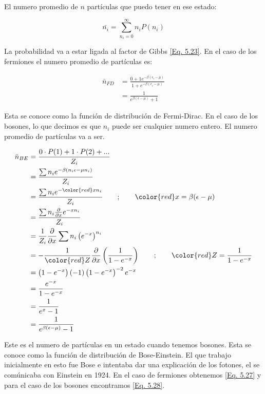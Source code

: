 \documentclass[11pt,fleqn]{book}
\begin{document}
El numero promedio de $n$ partículas que puedo tener en ese estado:

\begin{equation*}
    \bar{n_{i}}=\sum_{n_{i}=0}^{\infty}n_{i}P(n_{i})
\end{equation*}

La probabilidad va a estar ligada al factor de Gibbs \ref{Eq. 5.23}.  En el caso de los fermiones el numero promedio de partículas es: 

\begin{equation}
    \begin{split}
        \bar{n}_{FD}&=\frac{0+1e^{-\beta(\epsilon_{i}-\mu)}}{1+e^{-\beta(\epsilon_{i}-\mu)}}\\
        &=\frac{1}{e^{\beta(\epsilon-\mu)}+1}
    \end{split} 
    \label{Eq. 5.27}
    \end{equation}

Esta se conoce como la función de distribución de Fermi-Dirac. En el caso de los bosones, lo que decimos es que $n_{i}$ puede ser cualquier numero entero. El numero promedio de partículas va a ser. 

\begin{equation}
    \begin{split}
        \bar{n}_{BE}&=\frac{0\cdot P(1)+1\cdot P(2)+...}{Z_{i}}\\
        &=\frac{\sum n_{i}e^{-\beta(n_{i}\epsilon-\mu n_{i})}}{Z_{i}}\\
        &=\frac{\sum n_{i}e^{-{\color{red}x}n_{i}}}{Z_{i}}\qquad;\qquad {\color{red}x}=\beta(\epsilon-\mu)\\
        &=\frac{\sum n_{i}\frac{\partial}{\partial x} e^{-xn_{i}}}{Z_{i}}\\
        &=\frac{1}{Z_{i}}\frac{\partial}{\partial x}\sum n_{i}\left(e^{-x}\right)^{n_{i}}\\
        &=-\frac{1}{{\color{red}Z}}\frac{\partial}{\partial x}\left(\frac{1}{1-e^{-x}}\right)\qquad;\qquad {\color{red}Z}=\frac{1}{1-e^{-x}}\\
        &=\left(1-e^{-x}\right)(-1)\left(1-e^{-x}\right)^{-2}e^{-x}\\
        &=\frac{e^{-x}}{1-e^{-x}}\\
        &=\frac{1}{e^{x}-1}\\
        &=\frac{1}{e^{\beta(\epsilon-\mu)}-1}
    \end{split}
    \label{Eq. 5.28}
\end{equation}

Este es el numero de partículas en un estado cuando tenemos bosones. Esta se conoce como la función de distribución de Bose-Einstein. El que trabajo inicialmente en esto fue Bose e intentaba dar una explicación de los fotones, el se comúnicaba con Einstein en 1924. En el caso de fermiones obtenemos \ref{Eq. 5.27} y para el caso de los bosones encontramos \ref{Eq. 5.28}.\\
\end{document}
